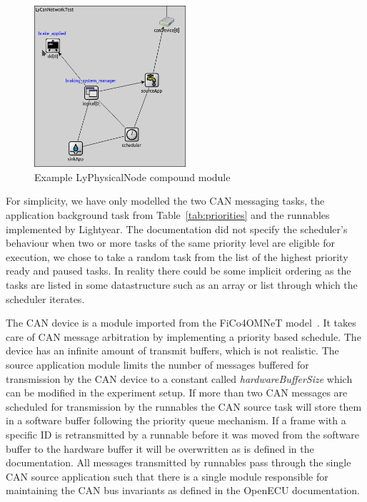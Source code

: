 \begin{figure}[htb]
    \centering
    \includegraphics[width=0.5\textwidth]{images/LyPhysicalNode_example.png}
    \caption{Example LyPhysicalNode compound module}
    \label{fig:lyphysicalnode}
\end{figure}

For simplicity, we have only modelled the two CAN messaging tasks, the application background task from Table~\ref{tab:priorities} and the runnables implemented by Lightyear. The documentation did not specify the scheduler's behaviour when two or more tasks of the same priority level are eligible for execution, we chose to take a random task from the list of the highest priority ready and paused tasks. In reality there could be some implicit ordering as the tasks are listed in some datastructure such as an array or list through which the scheduler iterates. 

The CAN device is a module imported from the FiCo4OMNeT model~\cite{meyer2019simulation}. It takes care of CAN message arbitration by implementing a priority based schedule. The device has an infinite amount of transmit buffers, which is not realistic. The source application module limits the number of messages buffered for transmission by the CAN device to a constant called \textit{hardwareBufferSize} which can be modified in the experiment setup. If more than two CAN messages are scheduled for transmission by the runnables the CAN source task will store them in a software buffer following the priority queue mechanism. If a frame with a specific ID is retransmitted by a runnable before it was moved from the software buffer to the hardware buffer it will be overwritten as is defined in the documentation. All messages transmitted by runnables pass through the single CAN source application such that there is a single module responsible for maintaining the CAN bus invariants as defined in the OpenECU documentation. 

